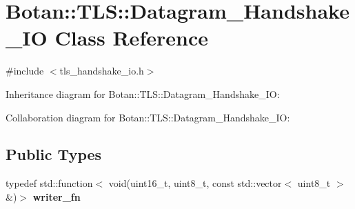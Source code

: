 \hypertarget{class_botan_1_1_t_l_s_1_1_datagram___handshake___i_o}{}\section{Botan\+:\+:T\+LS\+:\+:Datagram\+\_\+\+Handshake\+\_\+\+IO Class Reference}
\label{class_botan_1_1_t_l_s_1_1_datagram___handshake___i_o}


{\ttfamily \#include $<$tls\+\_\+handshake\+\_\+io.\+h$>$}



Inheritance diagram for Botan\+:\+:T\+LS\+:\+:Datagram\+\_\+\+Handshake\+\_\+\+IO\+:


Collaboration diagram for Botan\+:\+:T\+LS\+:\+:Datagram\+\_\+\+Handshake\+\_\+\+IO\+:
\subsection*{Public Types}
\begin{DoxyCompactItemize}
\item 
\mbox{\label{class_botan_1_1_t_l_s_1_1_datagram___handshake___i_o_ace94628c191efd3490344cc1adda3a61}} 
typedef std\+::function$<$ void(uint16\+\_\+t, uint8\+\_\+t, const std\+::vector$<$ uint8\+\_\+t $>$ \&)$>$ {\bfseries writer\+\_\+fn}
\end{DoxyCompactItemize}
